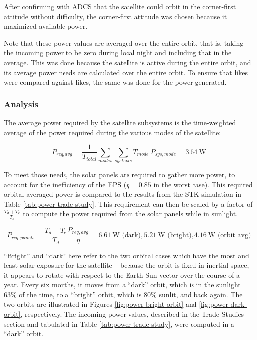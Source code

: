 \documentclass[12pt]{article}
\begin{document}
After confirming with ADCS that the satellite could orbit in the corner-first attitude without difficulty, the corner-first attitude was chosen because it maximized available power.

Note that these power values are averaged over the entire orbit, that is, taking the incoming power to be zero during local night and including that in the average.  This was done because the satellite is active during the entire orbit, and its average power needs are calculated over the entire orbit.  To ensure that likes were compared against likes, the same was done for the power generated.
			
			\subsubsection{Analysis}
			
The average power required by the satellite subsystems is the time-weighted average of the power required during the various modes of the satellite:

\begin{equation}
P_{req,avg} = \frac{1}{T_{total}}\sum_{modes}{ \sum_{systems}{T_{mode} \: P_{sys,mode}} } = 3.54 \ \text{W} 
\label{eq:power-required}
\end{equation}

To meet those needs, the solar panels are required to gather more power, to account for the inefficiency of the EPS ($\eta = 0.85$ in the worst case\cite[p.~9]{EPS-manual}).  This required orbital-averaged power is compared to the results from the STK simulation in Table \ref{tab:power-trade-study}.  This requirement can then be scaled by a factor of $\frac{T_d + T_e}{T_d}$ to compute the power required from the solar panels while in sunlight.

\begin{equation}
P_{req,panels} = \frac{T_d + T_e}{T_d}\frac{P_{req,avg}}{\eta} = 6.61 \ \text{W (dark)}, 5.21 \ \text{W (bright)}, 4.16 \ \text{W (orbit avg)}
\label{eq:power-required-panels}
\end{equation}

``Bright'' and ``dark'' here refer to the two orbital cases which have the most and least solar exposure for the satellite – because the orbit is fixed in inertial space, it appears to rotate with respect to the Earth-Sun vector over the course of a year.  Every six months, it moves from a ``dark'' orbit, which is in the sunlight 63\% of the time, to a ``bright'' orbit, which is 80\% sunlit, and back again.  The two orbits are illustrated in Figures \ref{fig:power-bright-orbit} and \ref{fig:power-dark-orbit}, respectively.  The incoming power values, described in the Trade Studies section and tabulated in Table \ref{tab:power-trade-study}, were computed in a ``dark'' orbit.
\end{document}

